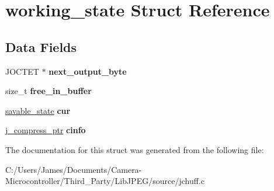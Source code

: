 \hypertarget{structworking__state}{}\section{working\+\_\+state Struct Reference}
\label{structworking__state}
\subsection*{Data Fields}
\begin{DoxyCompactItemize}
\item 
\mbox{\label{structworking__state_a3c91b5250e09dfa65e63ab97d6fdd6ce}} 
J\+O\+C\+T\+ET $\ast$ {\bfseries next\+\_\+output\+\_\+byte}
\item 
\mbox{\label{structworking__state_a84932d2a2b96ee83f5d2e9608b5fd83a}} 
size\+\_\+t {\bfseries free\+\_\+in\+\_\+buffer}
\item 
\mbox{\label{structworking__state_aa1af260a1bc64b5866ab320744e0320b}} 
\hyperlink{structsavable__state}{savable\+\_\+state} {\bfseries cur}
\item 
\mbox{\label{structworking__state_a51c360f99878652e5a939fcbe63f7086}} 
\hyperlink{structjpeg__compress__struct}{j\+\_\+compress\+\_\+ptr} {\bfseries cinfo}
\end{DoxyCompactItemize}


The documentation for this struct was generated from the following file\+:\begin{DoxyCompactItemize}
\item 
C\+:/\+Users/\+James/\+Documents/\+Camera-\/\+Microcontroller/\+Third\+\_\+\+Party/\+Lib\+J\+P\+E\+G/source/jchuff.\+c\end{DoxyCompactItemize}

